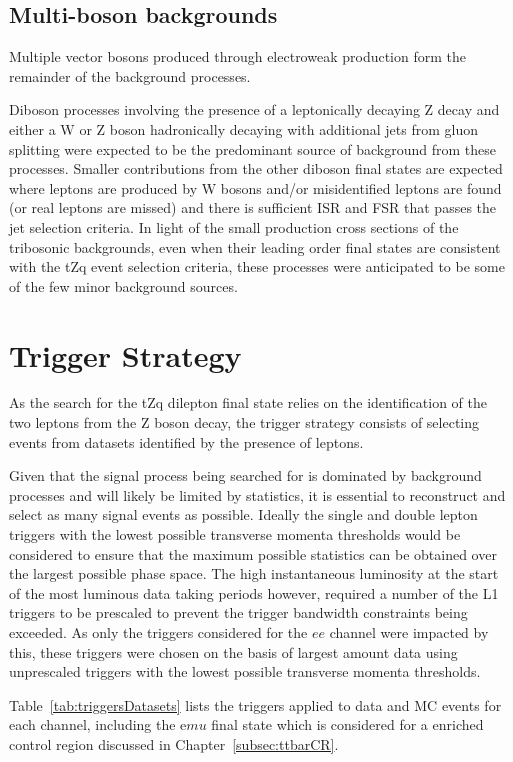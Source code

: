 \subsection{Multi-boson backgrounds}
Multiple vector bosons produced through electroweak production form the remainder of the background processes.

Diboson processes involving the presence of a leptonically decaying Z decay and either a W or Z boson hadronically decaying with additional jets from gluon splitting were expected to be the predominant source of background from these processes.
Smaller contributions from the other diboson final states are expected where leptons are produced by W bosons and/or misidentified leptons are found (or real leptons are missed) and there is sufficient ISR and FSR that passes the jet selection criteria.
In light of the small production cross sections of the tribosonic backgrounds, even when their leading order final states are consistent with the tZq event selection criteria, these processes were anticipated to be some of the few minor background sources.

\section{Trigger Strategy}\label{sec:triggerStrategy}
As the search for the tZq dilepton final state relies on the identification of the two leptons from the Z boson decay, the trigger strategy consists of selecting events from datasets identified by the presence of leptons.


Given that the signal process being searched for is dominated by background processes and will likely be limited by statistics, it is essential to reconstruct and select as many signal events as possible.
Ideally the single and double lepton triggers with the lowest possible transverse momenta thresholds would be considered to ensure that the maximum possible statistics can be obtained over the largest possible phase space.
The high instantaneous luminosity at the start of the most luminous data taking periods however, required a number of the L1 triggers to be prescaled to prevent the trigger bandwidth constraints being exceeded.
As only the triggers considered for the $ee$ channel were impacted by this, these triggers were chosen on the basis of largest amount data using unprescaled triggers with the lowest possible transverse momenta thresholds.

Table~\ref{tab:triggersDatasets} lists the triggers applied to data and MC events for each channel, including the e$mu$ final state which is considered for a \ttbar enriched control region discussed in Chapter~\ref{subsec:ttbarCR}.

